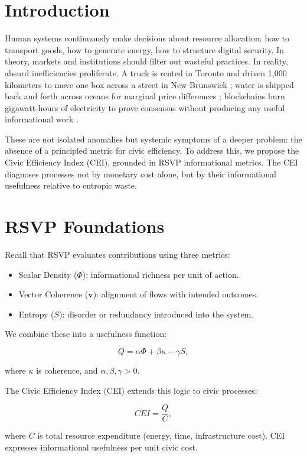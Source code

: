 \documentclass[openany]{book}
\begin{document}
\section{Introduction}

Human systems continuously make decisions about resource allocation: how to transport goods, how to generate energy, how to structure digital security. In theory, markets and institutions should filter out wasteful practices. In reality, absurd inefficiencies proliferate. A truck is rented in Toronto and driven 1,000 kilometers to move one box across a street in New Brunswick \cite{toronto2025}; water is shipped back and forth across oceans for marginal price differences \cite{water2025}; blockchains burn gigawatt-hours of electricity to prove consensus without producing any useful informational work \cite{nakamoto2008}.

These are not isolated anomalies but systemic symptoms of a deeper problem: the absence of a principled metric for civic efficiency. To address this, we propose the Civic Efficiency Index (CEI), grounded in RSVP informational metrics. The CEI diagnoses processes not by monetary cost alone, but by their informational usefulness relative to entropic waste.

\section{RSVP Foundations}

Recall that RSVP evaluates contributions using three metrics:

\begin{itemize}
    \item Scalar Density ($\Phi$): informational richness per unit of action.
    \item Vector Coherence ($\mathbf{v}$): alignment of flows with intended outcomes.
    \item Entropy ($S$): disorder or redundancy introduced into the system.
\end{itemize}

We combine these into a usefulness function:

\[ Q = \alpha \Phi + \beta \kappa - \gamma S, \]

where $\kappa$ is coherence, and $\alpha, \beta, \gamma > 0$.

The Civic Efficiency Index (CEI) extends this logic to civic processes:

\[ CEI = \frac{Q}{C}, \]

where $C$ is total resource expenditure (energy, time, infrastructure cost). CEI expresses informational usefulness per unit civic cost.
\end{document}
